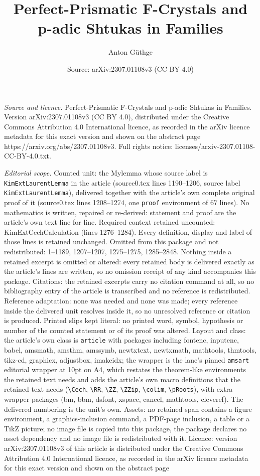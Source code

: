 \documentclass[10pt,a4paper]{amsart}
\title[Perfect-Prismatic F-Crystals and p-adic Shtukas in Families]{Perfect-Prismatic F-Crystals and p-adic Shtukas in Families}
\author{Anton G\"uthge}
\date{Source: arXiv:2307.01108v3 (CC BY 4.0)}
\begin{document}
\maketitle

\noindent\emph{Source and licence.} Perfect-Prismatic F-Crystals and p-adic Shtukas in Families. Version arXiv:2307.01108v3 (CC BY 4.0), distributed under the Creative Commons Attribution 4.0 International licence, as recorded in the arXiv licence metadata for this exact version and shown on the abstract page https://arxiv.org/abs/2307.01108v3. Full rights notice: licenses/arxiv-2307.01108-CC-BY-4.0.txt.\par\smallskip

\noindent\textit{Editorial scope.} Counted unit: the Mylemma whose source label is \texttt{KimExtLaurentLemma} in the article (source0.tex lines 1190--1206, source label \texttt{KimExtLaurentLemma}), delivered together with the article's own complete original proof of it (source0.tex lines 1208--1274, one \texttt{proof} environment of 67 lines). No mathematics is written, repaired or re-derived: statement and proof are the article's own text line for line. Required context retained uncounted: KimExtCechCalculation (lines 1276--1284). Every definition, display and label of those lines is retained unchanged. Omitted from this package and not redistributed: 1--1189, 1207--1207, 1275--1275, 1285--2848. Nothing inside a retained excerpt is omitted or altered: every retained body is delivered exactly as the article's lines are written, so no omission receipt of any kind accompanies this package. Citations: the retained excerpts carry no citation command at all, so no bibliography entry of the article is transcribed and no reference is redistributed. Reference adaptation: none was needed and none was made; every reference inside the delivered unit resolves inside it, so no unresolved reference or citation is produced. Printed slips kept literal: no printed word, symbol, hypothesis or number of the counted statement or of its proof was altered. Layout and class: the article's own class is \texttt{article} with packages including fontenc, inputenc, babel, amsmath, amsthm, amssymb, newtxtext, newtxmath, mathtools, thmtools, tikz-cd, graphicx, adjustbox, imakeidx; the wrapper is the lane's pinned \texttt{amsart} editorial wrapper at 10pt on A4, which restates the theorem-like environments the retained text needs and adds the article's own macro definitions that the retained text needs (\texttt{\textbackslash Cech}, \texttt{\textbackslash RR}, \texttt{\textbackslash ZZ}, \texttt{\textbackslash ZZip}, \texttt{\textbackslash colim}, \texttt{\textbackslash pRoots}), with extra wrapper packages (bm, bbm, dsfont, xspace, cancel, mathtools, cleveref). The delivered numbering is the unit's own. Assets: no retained span contains a figure environment, a graphics-inclusion command, a PDF-page inclusion, a table or a TikZ picture; no image file is copied into this package, the package declares no asset dependency and no image file is redistributed with it. Licence: version arXiv:2307.01108v3 of this article is distributed under the Creative Commons Attribution 4.0 International licence, as recorded in the arXiv licence metadata for this exact version and shown on the abstract page 
\end{document}
